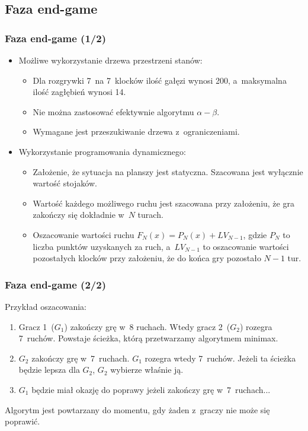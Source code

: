 \documentclass[10pt,a4paper]{beamer}
\begin{document}
\subsection{Faza end-game}

\begin{frame}
	\frametitle{Faza end-game (1/2)}
	
	\begin{itemize}
		\item Możliwe wykorzystanie drzewa przestrzeni stanów:
		\begin{itemize}
			\item Dla rozgrywki 7~na 7~klocków ilość gałęzi wynosi 200, a~maksymalna ilość zagłębień wynosi 14.
			\item Nie można zastosować efektywnie algorytmu $\alpha - \beta$.
			\item Wymagane jest przeszukiwanie drzewa z~ograniczeniami.
		\end{itemize}
		\item Wykorzystanie programowania dynamicznego:
			\begin{itemize}
				\item Założenie, że sytuacja na planszy jest statyczna. Szacowana jest wyłącznie wartość stojaków.
				\item Wartość każdego możliwego ruchu jest szacowana przy założeniu, że gra zakończy się dokładnie w~$N$ turach.
				\item Oszacowanie wartości ruchu $F_{N}(x) = P_{N}(x) + LV_{N-1}$, gdzie $P_{N}$ to liczba punktów uzyskanych za ruch, a~$LV_{N-1}$ to oszacowanie wartości pozostałych klocków przy założeniu, że do końca gry pozostało $N-1$ tur.
			\end{itemize}
	\end{itemize}
\end{frame}

\begin{frame}
	\frametitle{Faza end-game (2/2)}
	
	Przykład oszacowania:

	\begin{enumerate}
		\item Gracz 1~($G_{1}$) zakończy grę w~8 ruchach. Wtedy gracz 2~($G_{2}$) rozegra 7~ruchów. Powstaje ścieżka, którą przetwarzamy algorytmem minimax.
		\item $G_{2}$ zakończy grę w~7~ruchach. $G_{1}$ rozegra wtedy 7~ruchów. Jeżeli ta ścieżka będzie lepsza dla $G_{2}$, $G_{2}$ wybierze właśnie ją.
		\item $G_{1}$ będzie miał okazję do poprawy jeżeli zakończy grę w~7~ruchach...
	 \end{enumerate}

	 Algorytm jest powtarzany do momentu, gdy żaden z~graczy nie może się poprawić.
\end{frame}
\end{document}
